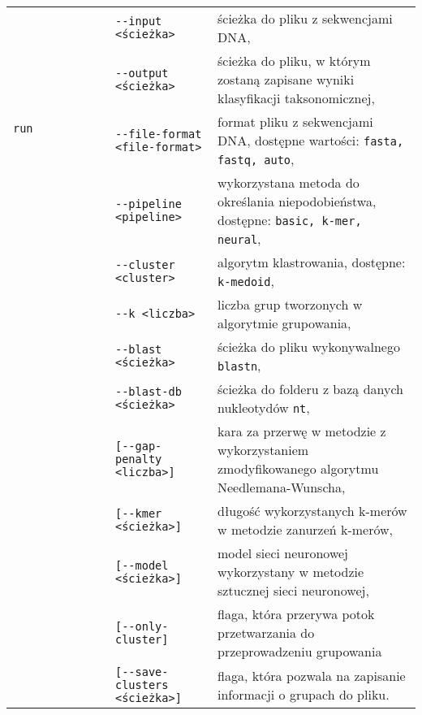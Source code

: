 \begin{table}[!h]
\begin{tabular}{| p{0.25\linewidth} | >{\footnotesize}p{0.25\linewidth} | >{\footnotesize}p{0.5\linewidth} | }
                        \multirow{4}{*}{\texttt{run}}       & \texttt{-\phantom{}-input <ścieżka>}           & ścieżka do pliku z sekwencjami DNA, \\
                                                            & \texttt{-\phantom{}-output <ścieżka>}          & ścieżka do pliku, w którym zostaną zapisane wyniki klasyfikacji taksonomicznej, \\
                                                            & \texttt{-\phantom{}-file-format <file-format>} & format pliku z sekwencjami DNA, dostępne wartości: \texttt{fasta, fastq, auto}, \\
                                                            & \texttt{-\phantom{}-pipeline <pipeline>}       & wykorzystana metoda do określania niepodobieństwa, dostępne: \texttt{basic, k-mer, neural}, \\
                                                            & \texttt{-\phantom{}-cluster <cluster>}         & algorytm klastrowania, dostępne: \texttt{k-medoid}, \\
                                                            & \texttt{-\phantom{}-k <liczba>}                & liczba grup tworzonych w algorytmie grupowania, \\
                                                            & \texttt{-\phantom{}-blast <ścieżka>}           & ścieżka do pliku wykonywalnego \texttt{blastn}, \\
                                                            & \texttt{-\phantom{}-blast-db <ścieżka>}        & ścieżka do folderu z bazą danych nukleotydów \texttt{nt}, \\
                                                            & \texttt{[-\phantom{}-gap-penalty <liczba>]}    & kara za przerwę w metodzie z wykorzystaniem zmodyfikowanego algorytmu Needlemana-Wunscha, \\
                                                            & \texttt{[-\phantom{}-kmer <ścieżka>]}          & długość wykorzystanych k-merów w metodzie zanurzeń k-merów, \\
                                                            & \texttt{[-\phantom{}-model <ścieżka>]}         & model sieci neuronowej wykorzystany w metodzie sztucznej sieci neuronowej, \\
                                                            & \texttt{[-\phantom{}-only-cluster]}            & flaga, która przerywa potok przetwarzania do przeprowadzeniu grupowania \\
                                                            & \texttt{[-\phantom{}-save-clusters <ścieżka>]} & flaga, która pozwala na zapisanie informacji o grupach do pliku. \\ \hline 
                    \end{tabular}
                
                \end{table}

